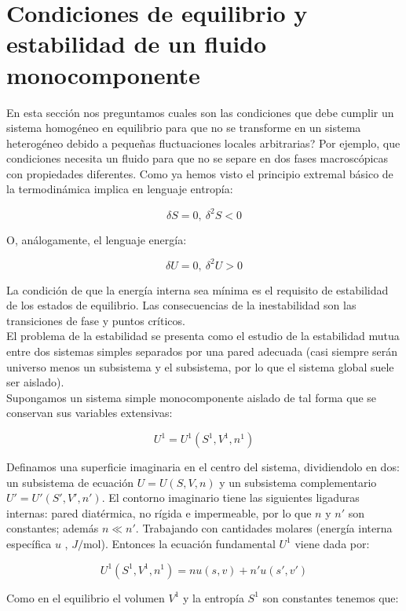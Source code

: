 \documentclass[12pt,a4paper]{article}
\begin{document}
\newpage

\section{Condiciones de equilibrio y estabilidad de un fluido monocomponente}

En esta sección nos preguntamos cuales son las condiciones que debe cumplir un sistema homogéneo en equilibrio para que no se transforme en un sistema heterogéneo debido a pequeñas fluctuaciones locales arbitrarias? Por ejemplo, que condiciones necesita un fluido para que no se separe en dos fases macroscópicas con propiedades diferentes. Como ya hemos visto el principio extremal básico de la termodinámica implica en lenguaje entropía:

$$ \delta S = 0, \ \delta^2 S < 0 $$

O, análogamente, el lenguaje energía:

$$ \delta U = 0, \ \delta^2 U > 0 $$

La condición de que la energía interna sea mínima es el requisito de estabilidad de los estados de equilibrio. Las consecuencias de la inestabilidad son las transiciones de fase y puntos críticos. \\

El problema de la estabilidad se presenta como el estudio de la estabilidad mutua entre dos sistemas simples separados por una pared adecuada (casi siempre serán universo menos un subsistema y el subsistema, por lo que el sistema global suele ser aislado). \\

Supongamos un sistema simple monocomponente aislado de tal forma que se conservan sus variables extensivas:

$$ U^1 = U^1 (S^1, V^1, n^1) $$

Definamos una superficie imaginaria en el centro del sistema, dividiendolo en dos: un subsistema de ecuación $U=U(S,V,n)$ y un subsistema complementario $U'=U'(S',V',n')$. El contorno imaginario tiene las siguientes ligaduras internas: pared diatérmica, no rígida e impermeable, por lo que $n$ y $n'$ son constantes; además $n \ll n'$. Trabajando con cantidades molares (energía interna específica $u$ , $J/\mathrm{mol}$). Entonces la ecuación fundamental $U^1$ viene dada por:

$$ U^1(S^1, V^1, n^1) =  n u(s,v) + n' u(s',v') $$

Como en el equilibrio el volumen $V^1$ y la entropía $S^1$ son constantes tenemos que:
\end{document}
